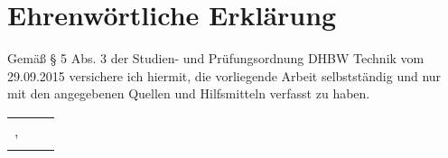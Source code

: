 \chapter*{Ehrenw{\"o}rtliche Erkl{\"a}rung}

Gem{\"a}{\ss} § 5 Abs. 3 der Studien- und Pr{\"u}fungsordnung DHBW Technik vom 29.09.2015 versichere ich hiermit, die vorliegende Arbeit selbstst{\"a}ndig und nur mit den angegebenen Quellen und Hilfsmitteln verfasst zu haben.

\begin{center}
	\vspace{1.4cm}
	\begin{tabular}{p{6cm} p{1cm} p{5cm}}
		\handoverdate, \city \\
		\cline{3-3}
		\null & \null & \studentname
	\end{tabular}
\end{center}
